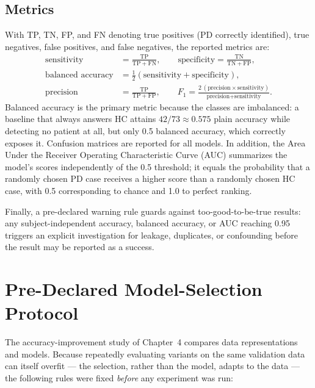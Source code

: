 \subsection{Metrics}

With TP, TN, FP, and FN denoting true positives (PD correctly
identified), true negatives, false positives, and false negatives, the
reported metrics are:
\begin{align}
\text{sensitivity} &= \frac{\mathrm{TP}}{\mathrm{TP}+\mathrm{FN}},
\qquad
\text{specificity} = \frac{\mathrm{TN}}{\mathrm{TN}+\mathrm{FP}},
\label{eq:sensspec}\\[4pt]
\text{balanced accuracy} &=
\tfrac{1}{2}\left(\text{sensitivity}+\text{specificity}\right),
\label{eq:balacc}\\[4pt]
\text{precision} &= \frac{\mathrm{TP}}{\mathrm{TP}+\mathrm{FP}},
\qquad
F_1 = \frac{2\,(\text{precision}\times\text{sensitivity})}
           {\text{precision}+\text{sensitivity}}.
\label{eq:f1}
\end{align}
Balanced accuracy is the primary metric because the classes are
imbalanced: a baseline that always answers HC attains
$42/73 \approx 0.575$ plain accuracy while detecting no patient at
all, but only 0.5 balanced accuracy, which correctly exposes it.
Confusion matrices are reported for all models. In addition, the Area
Under the Receiver Operating Characteristic Curve (AUC) summarizes the
model's scores independently of the 0.5 threshold; it equals the
probability that a randomly chosen PD case receives a higher score
than a randomly chosen HC case, with 0.5 corresponding to chance and
1.0 to perfect ranking.

Finally, a pre-declared warning rule guards against too-good-to-be-true
results: any subject-independent accuracy, balanced accuracy, or AUC
reaching 0.95 triggers an explicit investigation for leakage,
duplicates, or confounding before the result may be reported as a
success.

\section{Pre-Declared Model-Selection Protocol}

The accuracy-improvement study of Chapter~4 compares data
representations and models. Because repeatedly evaluating variants on
the same validation data can itself overfit --- the selection, rather
than the model, adapts to the data --- the following rules were fixed
\emph{before} any experiment was run:

